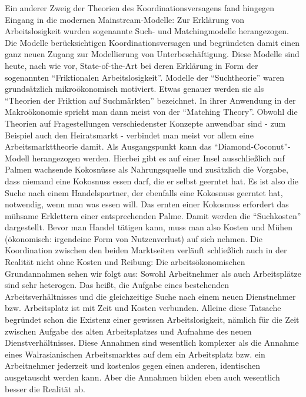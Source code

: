 Ein anderer Zweig der Theorien des Koordinationsversagens fand hingegen Eingang in die modernen Mainstream-Modelle: Zur Erklärung von Arbeitslosigkeit wurden sogenannte Such- und Matchingmodelle herangezogen. Die Modelle berücksichtigen Koordinationsversagen und begründeten damit einen ganz neuen Zugang zur Modellierung von Unterbeschäftigung.  Diese Modelle sind heute, nach wie vor, State-of-the-Art bei deren Erklärung in Form der sogenannten "`Friktionalen Arbeitslosigkeit"'. 
Modelle der "`Suchtheorie"' waren grundsätzlich mikroökonomisch motiviert. Etwas genauer werden sie als "`Theorien der Friktion auf Suchmärkten"' bezeichnet. In ihrer Anwendung in der Makroökonomie spricht man dann meist von der "`Matching Theory"'. Obwohl die Theorien auf Fragestellungen verschiedenster Konzepte anwendbar sind - zum Beispiel auch den Heiratsmarkt - verbindet man meist vor allem eine Arbeitsmarkttheorie damit.
Als Ausgangspunkt kann das "`Diamond-Coconut"'-Modell herangezogen werden. Hierbei gibt es auf einer Insel ausschließlich auf Palmen wachsende Kokosnüsse als Nahrungsquelle und zusätzlich die Vorgabe, dass niemand eine Kokosnuss essen darf, die er selbst geerntet hat. Es ist also die Suche nach einem Handelspartner, der ebenfalls eine Kokosnuss geerntet hat, notwendig, wenn man was essen will. Das ernten einer Kokosnuss erfordert das mühsame Erklettern einer entsprechenden Palme. Damit werden die "`Suchkosten"' dargestellt. Bevor man Handel tätigen kann, muss man also Kosten und Mühen (ökonomisch: irgendeine Form von Nutzenverlust) auf sich nehmen. Die Koordination zwischen den beiden Marktseiten verläuft schließlich auch in der Realität nicht ohne Kosten und Reibung: Die arbeitsökonomischen Grundannahmen sehen wir folgt aus: Sowohl Arbeitnehmer als auch Arbeitsplätze sind sehr heterogen. Das heißt, die Aufgabe eines bestehenden Arbeitsverhältnisses und die gleichzeitige Suche nach einem neuen Dienstnehmer bzw. Arbeitsplatz ist mit Zeit und Kosten verbunden. Alleine diese Tatsache begründet schon die Existenz einer gewissen Arbeitslosigkeit, nämlich für die Zeit zwischen Aufgabe des alten Arbeitsplatzes und Aufnahme des neuen Dienstverhältnisses. Diese Annahmen sind wesentlich komplexer als die Annahme eines Walrasianischen Arbeitsmarktes auf dem ein Arbeitsplatz bzw. ein Arbeitnehmer jederzeit und kostenlos gegen einen anderen, identischen ausgetauscht werden kann. Aber die Annahmen bilden eben auch wesentlich besser die Realität ab. 

